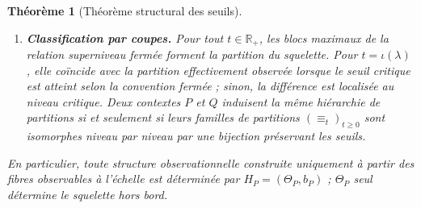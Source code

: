 \documentclass[11pt,a4paper,openany]{book}
\newtheorem{theorem}[definition]{Théorème}
\begin{document}
\begin{theorem}[Théorème structural des seuils]
\begin{enumerate}[label=\textbf{(\Alph*)}]
\item \textbf{Classification par coupes.} Pour tout \(t\in\mathbb R_+\), les blocs maximaux de la relation superniveau fermée forment la partition du squelette. Pour \(t=\iota(\lambda)\), elle coïncide avec la partition effectivement observée lorsque le seuil critique est atteint selon la convention fermée ; sinon, la différence est localisée au niveau critique. Deux contextes \(P\) et \(Q\) induisent la même hiérarchie de partitions si et seulement si leurs familles de partitions \((\equiv_t)_{t\ge 0}\) sont isomorphes niveau par niveau par une bijection préservant les seuils.
\end{enumerate}

En particulier, toute structure observationnelle construite uniquement à partir des fibres observables à l'échelle est déterminée par \(H_P=(\Theta_P,b_P)\) ; \(\Theta_P\) seul détermine le squelette hors bord.
\end{theorem}
\end{document}
